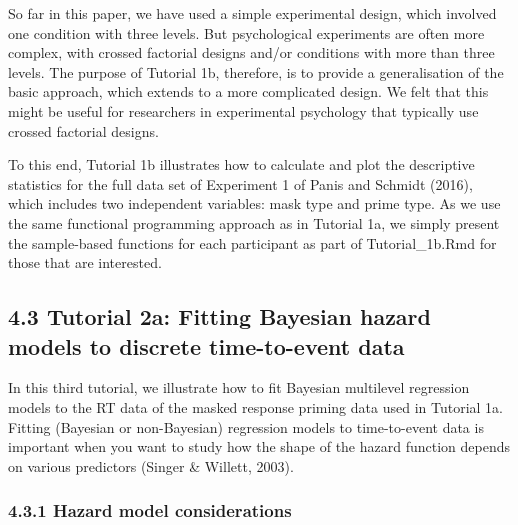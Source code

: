 \documentclass[
  man, donotrepeattitle,floatsintext]{apa6}
\begin{document}
So far in this paper, we have used a simple experimental design, which involved one condition with three levels. But psychological experiments are often more complex, with crossed factorial designs and/or conditions with more than three levels. The purpose of Tutorial 1b, therefore, is to provide a generalisation of the basic approach, which extends to a more complicated design. We felt that this might be useful for researchers in experimental psychology that typically use crossed factorial designs.

To this end, Tutorial 1b illustrates how to calculate and plot the descriptive statistics for the full data set of Experiment 1 of Panis and Schmidt (2016), which includes two independent variables: mask type and prime type. As we use the same functional programming approach as in Tutorial 1a, we simply present the sample-based functions for each participant as part of Tutorial\_1b.Rmd for those that are interested.

\subsection{4.3 Tutorial 2a: Fitting Bayesian hazard models to discrete time-to-event data}\label{tutorial-2a-fitting-bayesian-hazard-models-to-discrete-time-to-event-data}

In this third tutorial, we illustrate how to fit Bayesian multilevel regression models to the RT data of the masked response priming data used in Tutorial 1a. Fitting (Bayesian or non-Bayesian) regression models to time-to-event data is important when you want to study how the shape of the hazard function depends on various predictors (Singer \& Willett, 2003).

\subsubsection{4.3.1 Hazard model considerations}\label{hazard-model-considerations}
\end{document}
